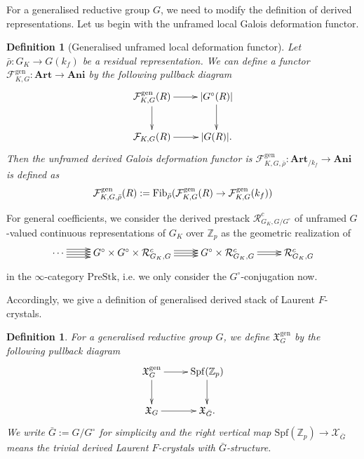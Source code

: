 \documentclass[10pt]{article}
\newtheorem{dfn}[thm]{Definition}
\numberwithin{equation}{section}
\newcommand{\frakX}{{\mathfrak X}}
\newcommand{\bZ}{{\mathbb Z}}
\newcommand{\calF}{{\mathcal F}}
\newcommand{\calR}{{\mathcal R}}
\newcommand{\calX}{{\mathcal X}}
\newcommand{\Spf}{{\mathrm{Spf}}}           %
\newcommand{\PreStk}{{\mathrm{PreStk}}}
\newcommand{\gen}{{\mathrm{gen}}}
\begin{document}
For a generalised reductive group $G$, we need to modify the definition of derived representations. Let us begin with the unframed local Galois deformation functor.
\begin{dfn}[Generalised unframed local deformation functor]
 Let $\bar \rho:G_K\to G(k_f)$ be a residual representation. We can define a functor $\calF_{K,G}^{\gen}:{\textbf{Art}}\to \textbf{Ani}$ by the following pullback diagram
 \begin{equation}
     \xymatrix{
     \calF_{K,G}^{\gen}(R)\ar[r]\ar[d]& |G^\circ(R)|\ar[d]\\
     \calF_{K,G}(R)\ar[r]& |G(R)|.
     }\end{equation}
   Then the unframed derived Galois deformation functor is $\calF_{K,G,\bar\rho}^{\gen}:{\textbf{Art}_{/k_f}}\to \textbf{Ani}$ is defined as
    \[
   \calF_{K,G,\bar\rho}^{\gen}(R):={\rm Fib}_{\bar\rho}( \calF_{K,G}^{\gen}(R)\to  \calF_{K,G}^{\gen}(k_f))
    \] 
\end{dfn}

For general coefficients, we consider the derived prestack $ \calR_{G_K,G/G^{\circ}}^{c}$ of unframed $G$-valued continuous representations of $G_K$ over $\bZ_p$ as the geometric realization of 
    \begin{equation}\label{unframed}
        \xymatrix{
        \cdots\ar@<-.9ex>[r]\ar@<-.3ex>[r]\ar@<.3ex>[r]\ar@<.9ex>[r]&G^{\circ}\times G^{\circ}\times  \calR_{G_K,G}^{c}\ar@<-.6ex>[r]\ar@<.0ex>[r]\ar@<.6ex>[r]&G^{\circ}\times  \calR_{G_K,G}^{c}\ar@<-.3ex>[r]\ar@<.3ex>[r]&\calR_{G_K,G}^{c}
        }
    \end{equation}
    in the $\infty$-category $\PreStk$, i.e. we only consider the $G^{\circ}$-conjugation now.




Accordingly, we give a definition of generalised derived stack of Laurent $F$-crystals.

\begin{dfn}\label{dfn-gen-derived}
    For a generalised reductive group $G$, we define $\frakX_G^{\gen}$ by the following pullback diagram
    \begin{equation}
        \xymatrix{
        \frakX_G^{\gen}\ar[r]\ar[d]& \Spf(\bZ_p)\ar[d]\\
        \frakX_G\ar[r]& \frakX_{\bar G}.
        }
    \end{equation}
    We write $\bar G:=G/G^{\circ}$ for simplicity and the right vertical map $\Spf(\bZ_p)\to \calX_{\bar G}$ means the trivial derived Laurent $F$-crystals with $\bar G$-structure.
\end{dfn}
\end{document}
